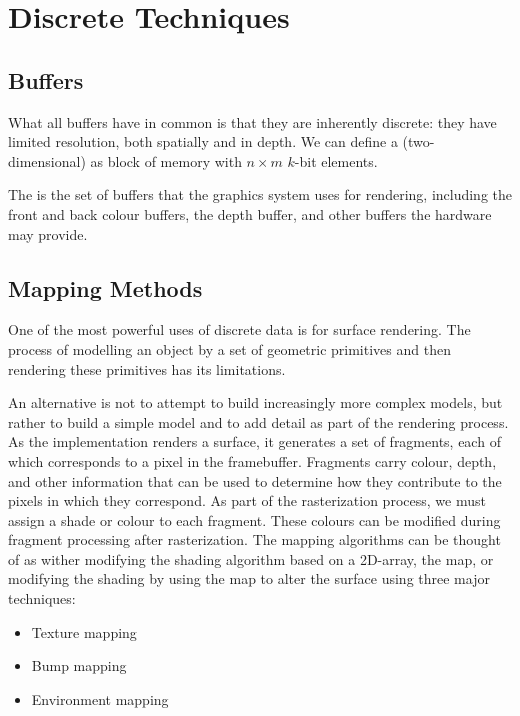 \documentclass[../COS3712_Notes.tex]{subfiles}
\begin{document}
  \setcounter{chapter}{6}
  \chapter{Discrete Techniques}
    \section{Buffers}
      What all buffers have in common is that they are inherently discrete:
      they have limited resolution, both spatially and in depth.
      We can define a (two-dimensional)  as block of memory with
      $n \times m$ $k$-bit elements.

      The  is the set of buffers that the graphics system uses for rendering,
      including the front and back colour buffers, the depth buffer, and other buffers
      the hardware may provide.

    \section{Mapping Methods}
      One of the most powerful uses of discrete data is for surface rendering.
      The process of modelling an object by a set of geometric primitives and then rendering
      these primitives has its limitations.

      An alternative is not to attempt to build increasingly more complex models,
      but rather to build a simple model and to add detail as part of the rendering process.
      As the implementation renders a surface, it generates a set of fragments,
      each of which corresponds to a pixel in the framebuffer.
      Fragments carry colour, depth, and other information that can be used to determine
      how they contribute to the pixels in which they correspond.
      As part of the rasterization process, we must assign a shade or colour to each fragment.
      These colours can be modified during fragment processing after rasterization.
      The mapping algorithms can be thought of as wither modifying the shading algorithm
      based on a 2D-array, the map, or modifying the shading by using the map to alter the
      surface using three major techniques:
      \begin{itemize}[nosep]
        \item Texture mapping
        \item Bump mapping
        \item Environment mapping
      \end{itemize}
\end{document}
